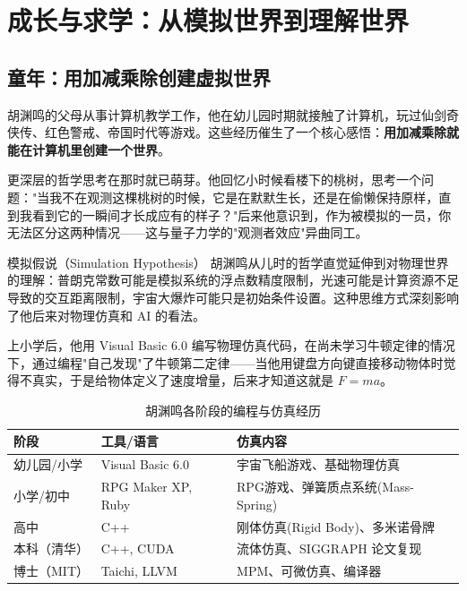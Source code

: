 \section{成长与求学：从模拟世界到理解世界}

\subsection{童年：用加减乘除创建虚拟世界}

胡渊鸣的父母从事计算机教学工作，他在幼儿园时期就接触了计算机，玩过仙剑奇侠传、红色警戒、帝国时代等游戏。这些经历催生了一个核心感悟：\textbf{用加减乘除就能在计算机里创建一个世界}。

更深层的哲学思考在那时就已萌芽。他回忆小时候看楼下的桃树，思考一个问题："当我不在观测这棵桃树的时候，它是在默默生长，还是在偷懒保持原样，直到我看到它的一瞬间才长成应有的样子？"后来他意识到，作为被模拟的一员，你无法区分这两种情况——这与量子力学的"观测者效应"异曲同工。

\begin{knowledgebox}{模拟假说（Simulation Hypothesis）}
胡渊鸣从儿时的哲学直觉延伸到对物理世界的理解：普朗克常数可能是模拟系统的浮点数精度限制，光速可能是计算资源不足导致的交互距离限制，宇宙大爆炸可能只是初始条件设置。这种思维方式深刻影响了他后来对物理仿真和 AI 的看法。
\end{knowledgebox}

上小学后，他用 Visual Basic 6.0 编写物理仿真代码，在尚未学习牛顿定律的情况下，通过编程"自己发现"了牛顿第二定律——当他用键盘方向键直接移动物体时觉得不真实，于是给物体定义了速度增量，后来才知道这就是 $F = ma$。

\begin{table}[H]
\centering
\caption{胡渊鸣各阶段的编程与仿真经历}
\begin{tabular}{lll}
\toprule
\textbf{阶段} & \textbf{工具/语言} & \textbf{仿真内容} \\
\midrule
幼儿园/小学 & Visual Basic 6.0 & 宇宙飞船游戏、基础物理仿真 \\
小学/初中 & RPG Maker XP, Ruby & RPG游戏、弹簧质点系统(Mass-Spring) \\
高中 & C++ & 刚体仿真(Rigid Body)、多米诺骨牌 \\
本科（清华） & C++, CUDA & 流体仿真、SIGGRAPH 论文复现 \\
博士（MIT） & Taichi, LLVM & MPM、可微仿真、编译器 \\
\bottomrule
\end{tabular}
\end{table}

